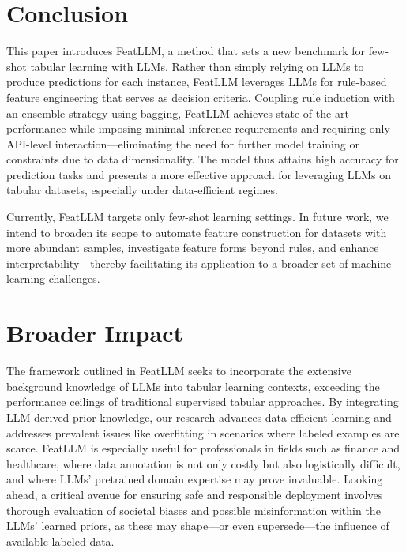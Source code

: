\section{Conclusion}
This paper introduces \textsf{FeatLLM}, a method that sets a new benchmark for few-shot tabular learning with LLMs. Rather than simply relying on LLMs to produce predictions for each instance, \textsf{FeatLLM} leverages LLMs for rule-based feature engineering that serves as decision criteria. Coupling rule induction with an ensemble strategy using bagging, \textsf{FeatLLM} achieves state-of-the-art performance while imposing minimal inference requirements and requiring only API-level interaction—eliminating the need for further model training or constraints due to data dimensionality. The model thus attains high accuracy for prediction tasks and presents a more effective approach for leveraging LLMs on tabular datasets, especially under data-efficient regimes.

Currently, \textsf{FeatLLM} targets only few-shot learning settings. In future work, we intend to broaden its scope to automate feature construction for datasets with more abundant samples, investigate feature forms beyond rules, and enhance interpretability—thereby facilitating its application to a broader set of machine learning challenges.

\section{Broader Impact}
The framework outlined in \textsf{FeatLLM} seeks to incorporate the extensive background knowledge of LLMs into tabular learning contexts, exceeding the performance ceilings of traditional supervised tabular approaches. By integrating LLM-derived prior knowledge, our research advances data-efficient learning and addresses prevalent issues like overfitting in scenarios where labeled examples are scarce. \textsf{FeatLLM} is especially useful for professionals in fields such as finance and healthcare, where data annotation is not only costly but also logistically difficult, and where LLMs’ pretrained domain expertise may prove invaluable. Looking ahead, a critical avenue for ensuring safe and responsible deployment involves thorough evaluation of societal biases and possible misinformation within the LLMs’ learned priors, as these may shape—or even supersede—the influence of available labeled data.

